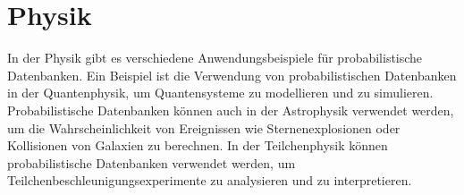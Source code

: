 \section{Physik}
In der Physik gibt es verschiedene Anwendungsbeispiele für probabilistische Datenbanken. Ein Beispiel ist die Verwendung von probabilistischen Datenbanken in der Quantenphysik, um Quantensysteme zu modellieren und zu simulieren. Probabilistische Datenbanken können auch in der Astrophysik verwendet werden, um die Wahrscheinlichkeit von Ereignissen wie Sternenexplosionen oder Kollisionen von Galaxien zu berechnen. In der Teilchenphysik können probabilistische Datenbanken verwendet werden, um Teilchenbeschleunigungsexperimente zu analysieren und zu interpretieren.









	